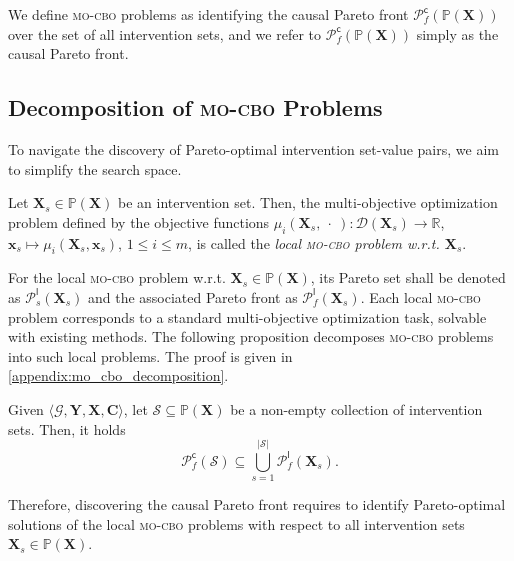We define \textsc{mo-cbo} problems as identifying the causal Pareto front $\mathcal{P}_f^{\mathsf{c}}(\mathbb{P}(\mathbf{X}))$ over the set of all intervention sets, and we refer to $\mathcal{P}_f^{\mathsf{c}}(\mathbb{P}(\mathbf{X}))$ simply as the causal Pareto front. 

\subsection{Decomposition of \textsc{mo-cbo} Problems}
To navigate the discovery of Pareto-optimal intervention set-value pairs, we aim to simplify the search space.  

\begin{definition}\label{def:local_mocbo_problem}
    Let $\textbf{X}_s \in \mathbb{P}(\mathbf{X})$ be an intervention set. Then, the multi-objective optimization problem defined by the objective functions $\mu_i(\mathbf{X}_s,\ \cdot \ ): \mathcal{D}(\mathbf{X}_s) \rightarrow \mathbb{R}$, $\mathbf{x}_s \mapsto \mu_i(\mathbf{X}_s,\mathbf{x}_s)$, $1 \leq i \leq m$, is called the \textit{local \textsc{mo-cbo} problem w.r.t. $\mathbf{X}_s$}.
\end{definition}

\noindent
For the local \textsc{mo-cbo} problem w.r.t. $\mathbf{X}_s \in \mathbb{P}(\mathbf{X})$, its Pareto set shall be denoted as $\mathcal{P}_s^{\mathsf{l}} (\mathbf{X}_s)$ and the associated Pareto front as $\mathcal{P}_f^{\mathsf{l}}(\mathbf{X}_s)$. Each local \textsc{mo-cbo} problem corresponds to a standard multi-objective optimization task, solvable with existing methods. The following proposition decomposes \textsc{mo-cbo} problems into such local problems. The proof is given in \cref{appendix:mo_cbo_decomposition}.

\begin{proposition}\label{prop:mo_cbo.decomposition}
Given $\langle \mathcal{G}, \mathbf{Y},\mathbf{X}, \mathbf{C} \rangle$, let $\mathcal{S} \subseteq \mathbb{P}(\mathbf{X})$ be a non-empty collection of intervention sets. Then, it holds
\begin{equation}
    \mathcal{P}_f^{\mathsf{c}}(\mathcal{S}) \subseteq \bigcup_{s=1}^{|\mathcal{S}|} \mathcal{P}_f^{\mathsf{l}}(\mathbf{X}_s).
\end{equation}
\end{proposition}

\noindent
Therefore, discovering the causal Pareto front requires to identify Pareto-optimal solutions of the local \textsc{mo-cbo} problems with respect to all intervention sets $\mathbf{X}_s \in \mathbb{P}(\mathbf{X})$.